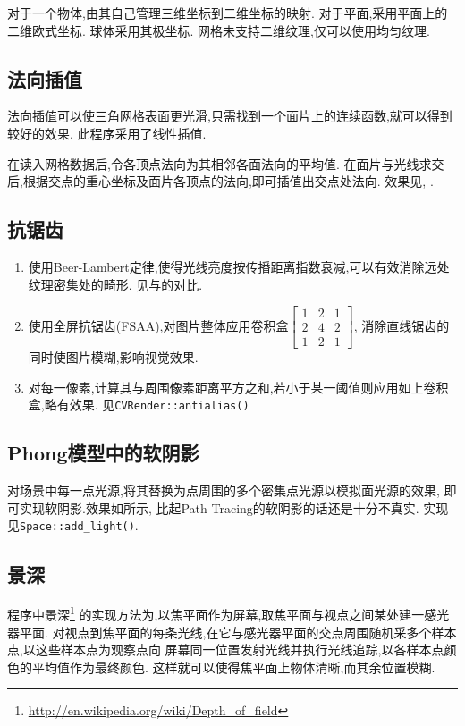 对于一个物体,由其自己管理三维坐标到二维坐标的映射.
对于平面,采用平面上的二维欧式坐标. 球体采用其极坐标.
网格未支持二维纹理,仅可以使用均匀纹理.

\subsection{法向插值}
\label{sec:smooth}
法向插值可以使三角网格表面更光滑,只需找到一个面片上的连续函数,就可以得到较好的效果.
此程序采用了线性插值.

在读入网格数据后,令各顶点法向为其相邻各面法向的平均值.
在面片与光线求交后,根据交点的重心坐标及面片各顶点的法向,即可插值出交点处法向.
效果见, .

\subsection{抗锯齿}
\begin{enumerate}
  \item 使用Beer-Lambert定律\cite{beer},使得光线亮度按传播距离指数衰减,可以有效消除远处纹理密集处的畸形.
    见与的对比.

  \item 使用全屏抗锯齿(FSAA),对图片整体应用卷积盒$\begin{bmatrix}1 & 2 & 1\\2 & 4 & 2\\1 & 2 & 1\end{bmatrix} $,
    消除直线锯齿的同时使图片模糊,影响视觉效果.

  \item 对每一像素,计算其与周围像素距离平方之和,若小于某一阈值则应用如上卷积盒,略有效果. 见\verb|CVRender::antialias()|
\end{enumerate}

\subsection{Phong模型中的软阴影}
\label{sec:soft}
对场景中每一点光源,将其替换为点周围的多个密集点光源以模拟面光源的效果,
即可实现软阴影.效果如所示, 比起Path Tracing的软阴影的话还是十分不真实. 实现见\verb|Space::add_light()|.

\subsection{景深}
程序中景深\footnote{\url{http://en.wikipedia.org/wiki/Depth\_of\_field}}
的实现方法为,以焦平面作为屏幕,取焦平面与视点之间某处建一感光器平面.
对视点到焦平面的每条光线,在它与感光器平面的交点周围随机采多个样本点,以这些样本点为观察点向
屏幕同一位置发射光线并执行光线追踪,以各样本点颜色的平均值作为最终颜色.
这样就可以使得焦平面上物体清晰,而其余位置模糊.

